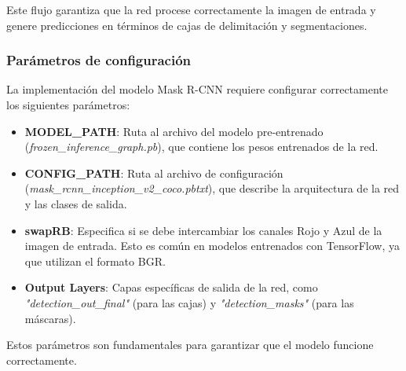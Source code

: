 \documentclass{article}
\begin{document}
Este flujo garantiza que la red procese correctamente la imagen de entrada y genere predicciones en términos de cajas de delimitación y segmentaciones.

\subsubsection{Parámetros de configuración}
La implementación del modelo Mask R-CNN requiere configurar correctamente los siguientes parámetros:

\begin{itemize}
    \item \textbf{MODEL\_PATH}: Ruta al archivo del modelo pre-entrenado (\textit{frozen\_inference\_graph.pb}), que contiene los pesos entrenados de la red.
    \item \textbf{CONFIG\_PATH}: Ruta al archivo de configuración (\textit{mask\_rcnn\_inception\_v2\_coco.pbtxt}), que describe la arquitectura de la red y las clases de salida.
    \item \textbf{swapRB}: Especifica si se debe intercambiar los canales Rojo y Azul de la imagen de entrada. Esto es común en modelos entrenados con TensorFlow, ya que utilizan el formato BGR.
    \item \textbf{Output Layers}: Capas específicas de salida de la red, como \textit{"detection\_out\_final"} (para las cajas) y \textit{"detection\_masks"} (para las máscaras).
\end{itemize}

Estos parámetros son fundamentales para garantizar que el modelo funcione correctamente.
\end{document}
